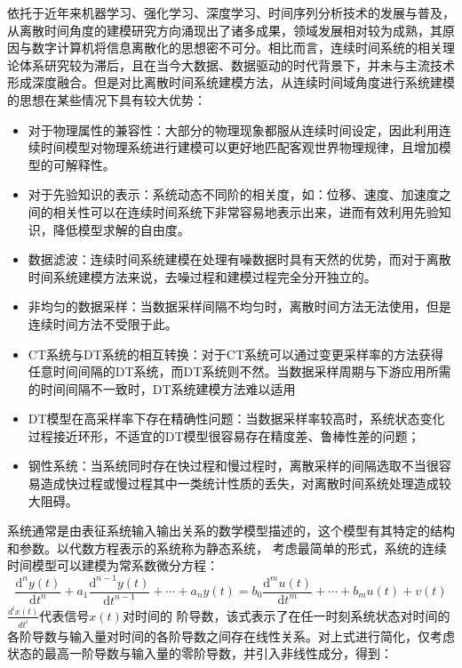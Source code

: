 依托于近年来机器学习、强化学习\cite{sutton2018reinforcement}、深度学习\cite{lecun2015deep}\cite{duan2016}、时间序列分析技术\cite{shumway2000time}的发展与普及，从离散时间角度的建模研究方向涌现出了诸多成果，领域发展相对较为成熟，其原因与数字计算机将信息离散化的思想密不可分。相比而言，连续时间系统的相关理论体系研究较为滞后，且在当今大数据、数据驱动的时代背景下，并未与主流技术形成深度融合。但是对比离散时间系统建模方法，从连续时间域角度进行系统建模的思想在某些情况下具有较大优势：
\begin{itemize}
\item	对于物理属性的兼容性：大部分的物理现象都服从连续时间设定，因此利用连续时间模型对物理系统进行建模可以更好地匹配客观世界物理规律，且增加模型的可解释性。
\item	对于先验知识的表示：系统动态不同阶的相关度，如：位移、速度、加速度之间的相关性可以在连续时间系统下非常容易地表示出来，进而有效利用先验知识，降低模型求解的自由度。
\item	数据滤波：连续时间系统建模在处理有噪数据时具有天然的优势，而对于离散时间系统建模方法来说，去噪过程和建模过程完全分开独立的。
\item	非均匀的数据采样：当数据采样间隔不均匀时，离散时间方法无法使用，但是连续时间方法不受限于此。
\item	CT系统与DT系统的相互转换：对于CT系统可以通过变更采样率的方法获得任意时间间隔的DT系统，而DT系统则不然。当数据采样周期与下游应用所需的时间间隔不一致时，DT系统建模方法难以适用
\item	DT模型在高采样率下存在精确性问题：当数据采样率较高时，系统状态变化过程接近环形，不适宜的DT模型很容易存在精度差、鲁棒性差的问题；
\item	钢性系统：当系统同时存在快过程和慢过程时，离散采样的间隔选取不当很容易造成快过程或慢过程其中一类统计性质的丢失，对离散时间系统处理造成较大阻碍。
\end{itemize}
系统通常是由表征系统输入输出关系的数学模型描述的，这个模型有其特定的结构和参数。以代数方程表示的系统称为静态系统，
考虑最简单的形式，系统的连续时间模型可以建模为常系数微分方程：
\begin{equation}
\frac{\mathrm{d}^{n} y(t)}{\mathrm{d} t^{n}}+a_{1} \frac{\mathrm{d}^{n-1} y(t)}{\mathrm{d} t^{n-1}}+\cdots+a_{n} y(t)=b_{0} \frac{\mathrm{d}^{m} u(t)}{\mathrm{d} t^{m}}+\cdots+b_{m} u(t)+v(t)
\end{equation}
$\frac{d^{i} x(t)}{d t^{i}}$代表信号$x(t)$对时间的 阶导数，该式表示了在任一时刻系统状态对时间的各阶导数与输入量对时间的各阶导数之间存在线性关系。对上式进行简化，仅考虑状态的最高一阶导数与输入量的零阶导数，并引入非线性成分，得到：
